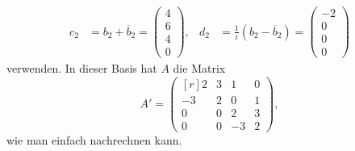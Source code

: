 \begin{loesung}
\begin{align*}
c_2
&=
b_2+\overline{b}_2 = \begin{pmatrix}4\\6\\4\\0\end{pmatrix},&
d_2
&=
\frac{1}{i}(b_2-\overline{b}_2) = \begin{pmatrix}-2\\0\\0\\0\end{pmatrix}
\end{align*}
verwenden.
In dieser Basis hat $A$ die Matrix
\[
A'
=
\begin{pmatrix*}[r]
 2& 3& 1& 0\\
-3& 2& 0& 1\\
 0& 0& 2& 3\\
 0& 0&-3& 2
\end{pmatrix*},
\]
wie man einfach nachrechnen kann.
\end{loesung}

